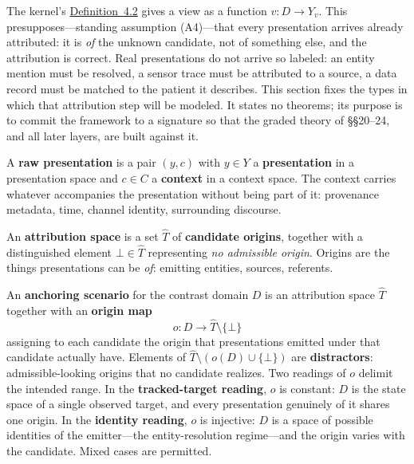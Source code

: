 
The kernel's \hyperlink{stmt:4.2}{Definition~4.2} gives a view as a function \(v : D \to Y_v\). This presupposes---\hspace{0pt}standing assumption (A4)---\hspace{0pt}that every presentation arrives already attributed: it is \emph{of} the unknown candidate, not of something else, and the attribution is correct. Real presentations do not arrive so labeled: an entity mention must be resolved, a sensor trace must be attributed to a source, a data record must be matched to the patient it describes. This section fixes the types in which that attribution step will be modeled. It states no theorems; its purpose is to commit the framework to a signature so that the graded theory of §§20--24, and all later layers, are built against it.

\begin{thmdef}

A \textbf{raw presentation} is a pair \((y, c)\) with \(y \in Y\) a \textbf{presentation} in a presentation space and \(c \in C\) a \textbf{context} in a context space. The context carries whatever accompanies the presentation without being part of it: provenance metadata, time, channel identity, surrounding discourse.
\end{thmdef}

\begin{thmdef}

An \textbf{attribution space} is a set \(\widehat{T}\) of \textbf{candidate origins}, together with a distinguished element \(\bot \in \widehat{T}\) representing \emph{no admissible origin}. Origins are the things presentations can be \emph{of}: emitting entities, sources, referents.
\end{thmdef}

\begin{thmdef}

An \textbf{anchoring scenario} for the contrast domain \(D\) is an attribution space \(\widehat{T}\) together with an \textbf{origin map}
\[
o : D \to \widehat{T} \setminus \{\bot\}
\]
assigning to each candidate the origin that presentations emitted under that candidate actually have. Elements of \(\widehat{T} \setminus (o(D) \cup \{\bot\})\) are \textbf{distractors}: admissible-looking origins that no candidate realizes. Two readings of \(o\) delimit the intended range. In the \textbf{tracked-target reading}, \(o\) is constant: \(D\) is the state space of a single observed target, and every presentation genuinely of it shares one origin. In the \textbf{identity reading}, \(o\) is injective: \(D\) is a space of possible identities of the emitter---\hspace{0pt}the entity-resolution regime---\hspace{0pt}and the origin varies with the candidate. Mixed cases are permitted.
\end{thmdef}

